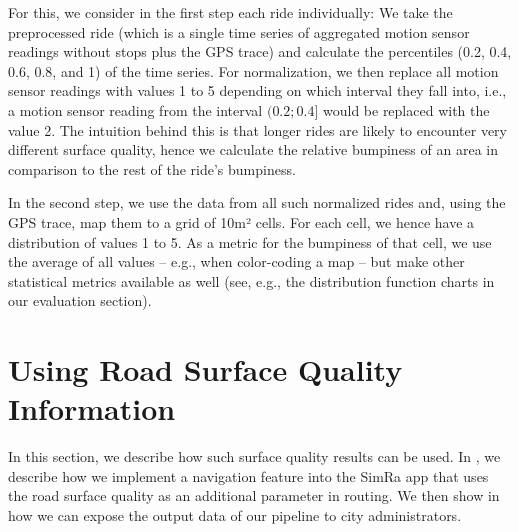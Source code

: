 For this, we consider in the first step each ride individually:
We take the preprocessed ride (which is a single time series of aggregated motion sensor readings without stops plus the GPS trace) and calculate the percentiles (0.2, 0.4, 0.6, 0.8, and 1) of the time series.
For normalization, we then replace all motion sensor readings with values 1 to 5 depending on which interval they fall into, i.e., a motion sensor reading from the interval $(0.2;0.4]$ would be replaced with the value 2.
The intuition behind this is that longer rides are likely to encounter very different surface quality, hence we calculate the relative bumpiness of an area in comparison to the rest of the ride's bumpiness.

In the second step, we use the data from all such normalized rides and, using the GPS trace, map them to a grid of 10m² cells.
For each cell, we hence have a distribution of values 1 to 5.
As a metric for the bumpiness of that cell, we use the average of all values -- e.g., when color-coding a map -- but make other statistical metrics available as well (see, e.g., the distribution function charts in our evaluation section).

\section{Using Road Surface Quality Information}
\label{sec:using_road_surface_quality_information}
In this section, we describe how such surface quality results can be used.
In , we describe how we implement a navigation feature into the SimRa app that uses the road surface quality as an additional parameter in routing.
We then show in  how we can expose the output data of our pipeline to city administrators.



